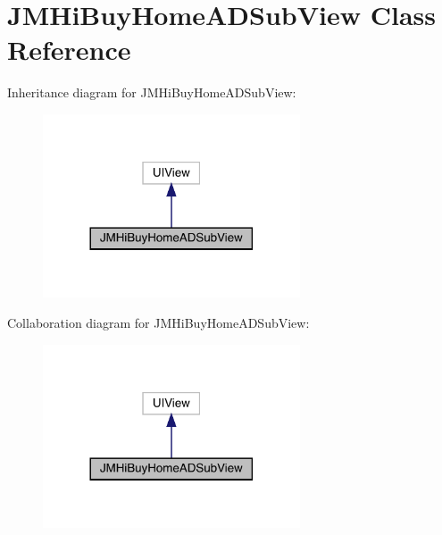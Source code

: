 \hypertarget{interface_j_m_hi_buy_home_a_d_sub_view}{}\section{J\+M\+Hi\+Buy\+Home\+A\+D\+Sub\+View Class Reference}
\label{interface_j_m_hi_buy_home_a_d_sub_view}


Inheritance diagram for J\+M\+Hi\+Buy\+Home\+A\+D\+Sub\+View\+:\nopagebreak
\begin{figure}[H]
\begin{center}
\leavevmode
\includegraphics[width=216pt]{interface_j_m_hi_buy_home_a_d_sub_view__inherit__graph}
\end{center}
\end{figure}


Collaboration diagram for J\+M\+Hi\+Buy\+Home\+A\+D\+Sub\+View\+:\nopagebreak
\begin{figure}[H]
\begin{center}
\leavevmode
\includegraphics[width=216pt]{interface_j_m_hi_buy_home_a_d_sub_view__coll__graph}
\end{center}
\end{figure}
